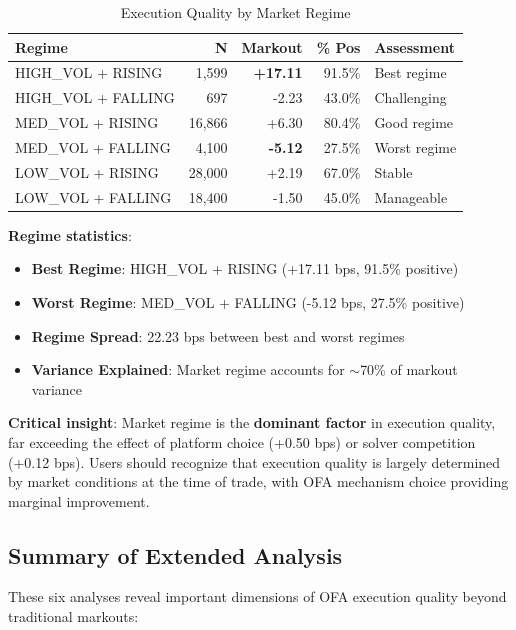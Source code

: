 \documentclass[12pt,a4paper]{article}
\begin{document}
\begin{table}[H]
\centering
\caption{Execution Quality by Market Regime}
\label{tab:regime}
\begin{tabular}{lrrrp{2.5cm}}
\toprule
\textbf{Regime} & \textbf{N} & \textbf{Markout} & \textbf{\% Pos} & \textbf{Assessment} \\
\midrule
HIGH\_VOL + RISING & 1,599 & \textbf{+17.11} & 91.5\% & Best regime \\
HIGH\_VOL + FALLING & 697 & -2.23 & 43.0\% & Challenging \\
MED\_VOL + RISING & 16,866 & +6.30 & 80.4\% & Good regime \\
MED\_VOL + FALLING & 4,100 & \textbf{-5.12} & 27.5\% & Worst regime \\
LOW\_VOL + RISING & 28,000 & +2.19 & 67.0\% & Stable \\
LOW\_VOL + FALLING & 18,400 & -1.50 & 45.0\% & Manageable \\
\bottomrule
\end{tabular}
\end{table}

\textbf{Regime statistics}:
\begin{itemize}
    \item \textbf{Best Regime}: HIGH\_VOL + RISING (+17.11 bps, 91.5\% positive)
    \item \textbf{Worst Regime}: MED\_VOL + FALLING (-5.12 bps, 27.5\% positive)
    \item \textbf{Regime Spread}: 22.23 bps between best and worst regimes
    \item \textbf{Variance Explained}: Market regime accounts for $\sim$70\% of markout variance
\end{itemize}

\textbf{Critical insight}: Market regime is the \textbf{dominant factor} in execution quality, far exceeding the effect of platform choice (+0.50 bps) or solver competition (+0.12 bps). Users should recognize that execution quality is largely determined by market conditions at the time of trade, with OFA mechanism choice providing marginal improvement.

\subsection{Summary of Extended Analysis}

These six analyses reveal important dimensions of OFA execution quality beyond traditional markouts:
\end{document}
